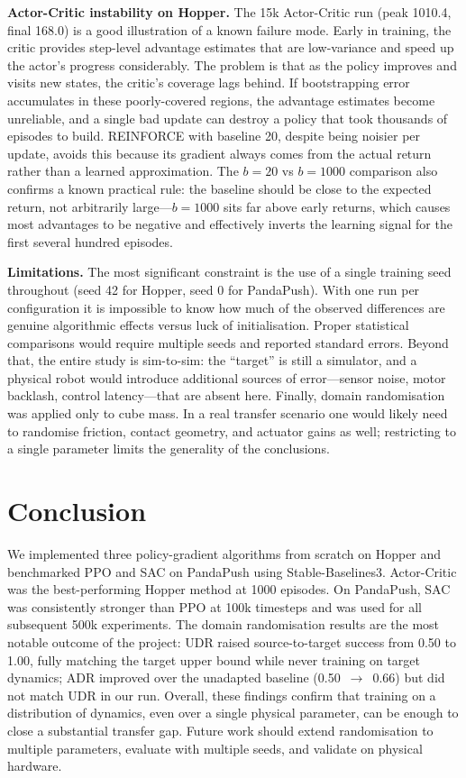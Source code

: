 \documentclass[10pt,twocolumn,letterpaper]{article}
\begin{document}
\textbf{Actor-Critic instability on Hopper.}
The 15k Actor-Critic run (peak 1010.4, final 168.0) is a good illustration of a known failure mode. Early in training, the critic provides step-level advantage estimates that are low-variance and speed up the actor's progress considerably. The problem is that as the policy improves and visits new states, the critic's coverage lags behind. If bootstrapping error accumulates in these poorly-covered regions, the advantage estimates become unreliable, and a single bad update can destroy a policy that took thousands of episodes to build. REINFORCE with baseline 20, despite being noisier per update, avoids this because its gradient always comes from the actual return rather than a learned approximation. The $b=20$ vs $b=1000$ comparison also confirms a known practical rule: the baseline should be close to the expected return, not arbitrarily large---$b=1000$ sits far above early returns, which causes most advantages to be negative and effectively inverts the learning signal for the first several hundred episodes.

\textbf{Limitations.}
The most significant constraint is the use of a single training seed throughout (seed 42 for Hopper, seed 0 for PandaPush). With one run per configuration it is impossible to know how much of the observed differences are genuine algorithmic effects versus luck of initialisation. Proper statistical comparisons would require multiple seeds and reported standard errors. Beyond that, the entire study is sim-to-sim: the ``target'' is still a simulator, and a physical robot would introduce additional sources of error---sensor noise, motor backlash, control latency---that are absent here. Finally, domain randomisation was applied only to cube mass. In a real transfer scenario one would likely need to randomise friction, contact geometry, and actuator gains as well; restricting to a single parameter limits the generality of the conclusions.

\section{Conclusion}

We implemented three policy-gradient algorithms from scratch on Hopper and benchmarked PPO and SAC on PandaPush using Stable-Baselines3. Actor-Critic was the best-performing Hopper method at 1000 episodes. On PandaPush, SAC was consistently stronger than PPO at 100k timesteps and was used for all subsequent 500k experiments. The domain randomisation results are the most notable outcome of the project: UDR raised source-to-target success from 0.50 to 1.00, fully matching the target upper bound while never training on target dynamics; ADR improved over the unadapted baseline (0.50~$\to$~0.66) but did not match UDR in our run. Overall, these findings confirm that training on a distribution of dynamics, even over a single physical parameter, can be enough to close a substantial transfer gap. Future work should extend randomisation to multiple parameters, evaluate with multiple seeds, and validate on physical hardware.
\end{document}
